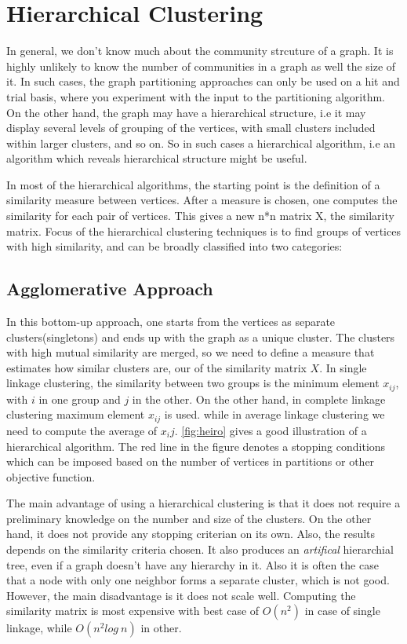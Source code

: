 \documentclass[letterpaper]{article}
\begin{document}
\section{Hierarchical Clustering} In general, we don't know much about the
community strcuture of a graph. It is highly unlikely to know the number of
communities in a graph as well the size of it. In such cases, the graph
partitioning approaches can only be used on a hit and trial basis, where you
experiment with the input to the partitioning algorithm. On the other hand, the
graph may have a hierarchical structure, i.e it may display several levels of
grouping of the vertices, with small clusters included within larger clusters,
and so on. So in such cases a hierarchical algorithm, i.e an algorithm which
reveals hierarchical structure might be useful. 

In most of the hierarchical algorithms, the starting point is the definition of
a similarity measure between vertices. After a measure is chosen, one computes
the similarity for each pair of vertices.  This gives a new n*n matrix X, the
similarity matrix. Focus of the hierarchical clustering techniques is to find
groups of vertices with high similarity, and can be broadly classified into two
categories:

\subsection{Agglomerative Approach}
In this bottom-up approach, one starts from the vertices as separate
clusters(singletons) and ends up with the graph as a unique cluster. The
clusters with high mutual similarity are merged, so we need to define a measure
that estimates how similar clusters are, our of the similarity matrix $X$. In
single linkage clustering, the similarity between two groups is the minimum
element $x_{ij}$, with $i$ in one group and $j$ in the other. On the other
hand, in complete linkage clustering maximum element $x_{ij}$ is used. while in
average linkage clustering we need to compute the average of $x_ij$.
\ref{fig:heiro} gives a good illustration of a hierarchical algorithm. The red
line in the figure denotes a stopping conditions which can be imposed based on
the number of vertices in partitions or other objective function. 

The main advantage of using a hierarchical clustering is that it does not
require a preliminary knowledge on the number and size of the clusters. On the
other hand, it does not provide any stopping criterian on its own. Also, the
results depends on the similarity criteria chosen. It also produces an
\emph{artifical} hierarchial tree, even if a graph doesn't have any hierarchy
in it. Also it is often the case that a node with only one neighbor forms a
separate cluster, which is not good. However, the main disadvantage is it does
not scale well.  Computing the similarity matrix is most expensive with best
case of $O(n^2)$ in case of single linkage, while $O(n^2 log\ n)$ in other.
\end{document}
